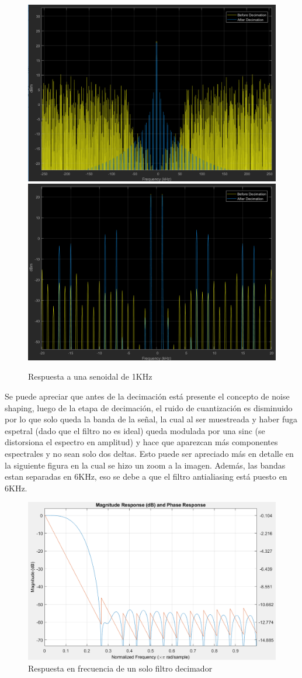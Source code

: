\documentclass[assd_tp3_main.tex]{subfiles}
\begin{document}
\begin{figure}[H]
\centering
\includegraphics[width=0.7\linewidth]{images/ej4/sin_response_1K.png}
\includegraphics[width=0.7\linewidth]{images/ej4/sin_response_1K_zoom.png}
\caption{Respuesta a una senoidal de 1KHz}
\label{fig:sin_response_1K}
\end{figure}
Se puede apreciar que antes de la decimación está presente el concepto de noise shaping, luego de la etapa de decimación, el ruido de cuantización es disminuido por lo que solo queda la banda de la señal, la cual al ser muestreada y haber fuga espetral (dado que el filtro no es ideal) queda modulada por una sinc (se distorsiona el espectro en amplitud) y hace que aparezcan más componentes espectrales y no sean solo dos deltas. Esto puede ser apreciado más en detalle en la siguiente figura en la cual se hizo un zoom a la imagen. Además, las bandas estan separadas en 6KHz, eso se debe a que el filtro antialiasing está puesto en 6KHz.

\begin{figure}[H]
\centering
\includegraphics[width=0.8\linewidth]{images/ej4/Decimation_1filt.png}
\caption{Respuesta en frecuencia de un solo filtro decimador}
\label{fig:Decimation_1filt}
\end{figure}
\end{document}
